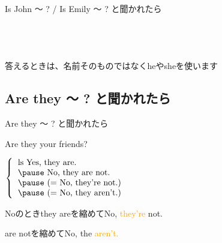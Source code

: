 \documentclass[aspectratio=169]{beamer}
\newcommand{\myaudio}[1]{\href{#1}{\faVolumeUp}}
\begin{document}
\begin{frame}[plain]{Is John  〜 ? / Is Emily 〜 ? と聞かれたら}
\begin{columns}[t]
\begin{column}{.49\textwidth}
\pause

\vspace{20pt}

\mbox{}\hfill\myaudio{./audio/009_answer_be_03.mp3}\,\,{}
\end{column}
\end{columns}

\pause

{\small 答えるときは、名前そのものではなくheやsheを使います}
\end{frame}

 \subsection{Are they 〜 ? と聞かれたら}
\begin{frame}[plain]{Are they 〜 ? と聞かれたら}
 \Large


\pause

Are they your friends?

\pause

\vspace{10pt}

\mbox{}\hspace{100pt}$\left\{\begin{tabular}{l}ls
         Yes, they are.\\\pause
         No, they are not.\\\pause
         \text{(}= \text{No, they're not.)}\\\pause
         \text{(}= \text{No, they aren't.)}
        \end{tabular}\right.$
\vspace{10pt}

\mbox{}\hfill{}{\small Noのときthey areを縮めてNo, \textcolor{orange}{they're} not.}

\vspace{-8pt}

\mbox{}\hfill{}{\small \phantom{Noのとき}are notを縮めてNo, the \textcolor{orange}{aren't.}}

\vspace{20pt}

\mbox{}\hfill\myaudio{./audio/009_answer_be_04.mp3}\,\,{}
\end{frame}
\end{document}
